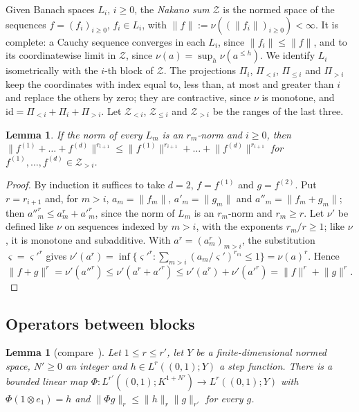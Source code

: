\documentclass[11pt]{amsart}
\newtheorem{lemma}[theorem]{Lemma}
\theoremstyle{definition}
\theoremstyle{remark}
\numberwithin{equation}{section}
\newcommand{\id}{\mathrm{id}}
\newcommand{\norm}[1]{\lVert #1\rVert}
\theoremstyle{plain}
\theoremstyle{definition}
\theoremstyle{plain}
\begin{document}
Given Banach spaces $L_i$, $i\ge0$, the \emph{Nakano sum} $\mathcal Z$ is the normed space of the sequences
$f=(f_i)_{i\ge0}$, $f_i\in L_i$, with $\norm f:=\nu((\norm{f_i})_{i\ge0})<\infty$. It is complete: a Cauchy sequence
converges in each $L_i$, since $\norm{f_i}\le\norm f$, and to its coordinatewise limit in $\mathcal Z$, since
$\nu(a)=\sup_h\nu(a^{\le h})$. We identify $L_i$ isometrically with the $i$\nobreakdash-th block of $\mathcal Z$. The
projections $\Pi_i$, $\Pi_{<i}$, $\Pi_{\le i}$ and $\Pi_{>i}$ keep the coordinates with index equal to, less than, at
most and greater than $i$ and replace the others by zero; they are contractive, since $\nu$ is monotone, and
$\id=\Pi_{<i}+\Pi_i+\Pi_{>i}$. Let $\mathcal Z_{<i}$, $\mathcal Z_{\le i}$ and $\mathcal Z_{>i}$ be the ranges of the
last three.

\begin{lemma}\label{rig:lem:nakano}
If the norm of every $L_m$ is an $r_m$\nobreakdash-norm and $i\ge0$, then
$\norm{f^{(1)}+\dots+f^{(d)}}^{r_{i+1}}\le\norm{f^{(1)}}^{r_{i+1}}+\dots+\norm{f^{(d)}}^{r_{i+1}}$ for
$f^{(1)},\dots,f^{(d)}\in\mathcal Z_{>i}$.
\end{lemma}

\begin{proof}
By induction it suffices to take $d=2$, $f=f^{(1)}$ and $g=f^{(2)}$. Put $r=r_{i+1}$ and, for $m>i$, $a_m=\norm{f_m}$,
$a'_m=\norm{g_m}$ and $a''_m=\norm{f_m+g_m}$; then $a''^r_m\le a^r_m+a'^r_m$, since the norm of $L_m$ is an
$r_m$\nobreakdash-norm and $r_m\ge r$. Let $\nu'$ be defined like $\nu$ on sequences indexed by $m>i$, with the
exponents $r_m/r\ge1$; like $\nu$, it is monotone and subadditive. With $a^r=(a^r_m)_{m>i}$, the substitution
$\varsigma=\varsigma'^r$ gives $\nu'(a^r)=\inf\{\varsigma'^r:\sum_{m>i}(a_m/\varsigma')^{r_m}\le1\}=\nu(a)^r$. Hence
\[
 \norm{f+g}^r=\nu'(a''^r)\le\nu'(a^r+a'^r)\le\nu'(a^r)+\nu'(a'^r)=\norm f^r+\norm g^r.
\]
\end{proof}

\subsection{Operators between blocks}\label{rig:ssec:operators}

\begin{lemma}[compare~{\cite[Lemma~2.2]{KR}}]\label{rig:lem:rolewicz}
Let $1\le r\le r'$, let $Y$ be a finite-dimensional normed space, $N'\ge0$ an integer and $h\in L^r((0,1);Y)$ a step
function. There is a bounded linear map $\Phi\colon L^{r'}((0,1);K^{1+N'})\to L^r((0,1);Y)$ with
$\Phi(1\otimes e_1)=h$ and $\norm{\Phi g}_r\le\norm h_r\norm g_{r'}$ for every $g$.
\end{lemma}
\end{document}
